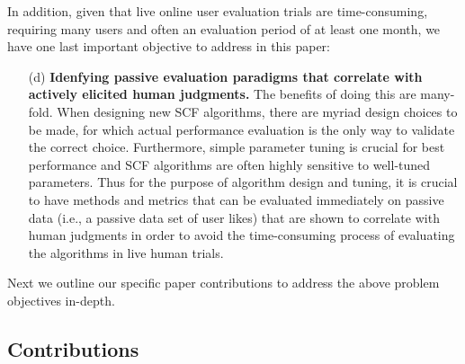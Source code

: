 \documentclass{sig-alternate}
\begin{document}
In addition, given that live online user evaluation trials are
time-consuming, requiring many users and often an evaluation period of
at least one month, we have one last important objective to address in
this paper:
\begin{enumerate}
\item[(d)] {\bf Idenfying passive evaluation paradigms that correlate
with actively elicited human judgments.}  The benefits of doing this
are many-fold.  When designing new SCF algorithms, there are myriad
design choices to be made, for which actual performance evaluation is
the only way to validate the correct choice.  Furthermore, simple
parameter tuning is crucial for best performance and SCF algorithms
are often highly sensitive to well-tuned parameters.  Thus for the
purpose of algorithm design and tuning, it is crucial to have methods
and metrics that can be evaluated immediately on passive data (i.e., a
passive data set of user likes) that are shown to correlate with human
judgments in order to avoid the time-consuming process of evaluating
the algorithms in live human trials.
\end{enumerate}

Next we outline our specific paper contributions to address
the above problem objectives in-depth.

\subsection{Contributions}

\label{sec:Contributions}
\end{document}
